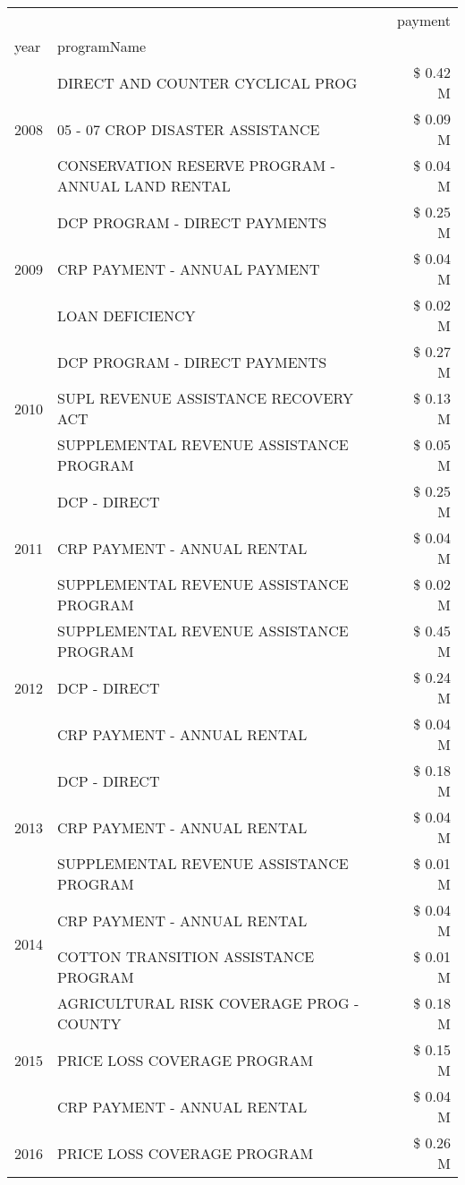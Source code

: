 \begin{tabular}{llr}
\toprule
 &  & payment \\
year & programName &  \\
\midrule
\multirow[t]{3}{*}{2008} & DIRECT AND COUNTER CYCLICAL PROG & \$ 0.42 M \\
 & 05 - 07 CROP DISASTER ASSISTANCE & \$ 0.09 M \\
 & CONSERVATION RESERVE PROGRAM - ANNUAL LAND RENTAL & \$ 0.04 M \\
\cline{1-3}
\multirow[t]{3}{*}{2009} & DCP PROGRAM - DIRECT PAYMENTS & \$ 0.25 M \\
 & CRP PAYMENT - ANNUAL PAYMENT & \$ 0.04 M \\
 & LOAN DEFICIENCY & \$ 0.02 M \\
\cline{1-3}
\multirow[t]{3}{*}{2010} & DCP PROGRAM - DIRECT PAYMENTS & \$ 0.27 M \\
 & SUPL REVENUE ASSISTANCE RECOVERY ACT & \$ 0.13 M \\
 & SUPPLEMENTAL REVENUE ASSISTANCE PROGRAM & \$ 0.05 M \\
\cline{1-3}
\multirow[t]{3}{*}{2011} & DCP - DIRECT & \$ 0.25 M \\
 & CRP PAYMENT - ANNUAL RENTAL & \$ 0.04 M \\
 & SUPPLEMENTAL REVENUE ASSISTANCE PROGRAM & \$ 0.02 M \\
\cline{1-3}
\multirow[t]{3}{*}{2012} & SUPPLEMENTAL REVENUE ASSISTANCE PROGRAM & \$ 0.45 M \\
 & DCP - DIRECT & \$ 0.24 M \\
 & CRP PAYMENT - ANNUAL RENTAL & \$ 0.04 M \\
\cline{1-3}
\multirow[t]{3}{*}{2013} & DCP - DIRECT & \$ 0.18 M \\
 & CRP PAYMENT - ANNUAL RENTAL & \$ 0.04 M \\
 & SUPPLEMENTAL REVENUE ASSISTANCE PROGRAM & \$ 0.01 M \\
\cline{1-3}
\multirow[t]{2}{*}{2014} & CRP PAYMENT - ANNUAL RENTAL & \$ 0.04 M \\
 & COTTON TRANSITION ASSISTANCE PROGRAM & \$ 0.01 M \\
\cline{1-3}
\multirow[t]{3}{*}{2015} & AGRICULTURAL RISK COVERAGE PROG - COUNTY & \$ 0.18 M \\
 & PRICE LOSS COVERAGE PROGRAM & \$ 0.15 M \\
 & CRP PAYMENT - ANNUAL RENTAL & \$ 0.04 M \\
\cline{1-3}
\multirow[t]{3}{*}{2016} & PRICE LOSS COVERAGE PROGRAM & \$ 0.26 M \\

\end{tabular}
